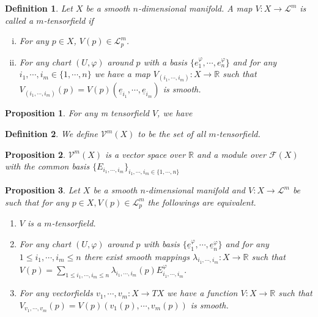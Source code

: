 \documentclass{article}
\newtheorem{proposition}{Proposition}[section]
\newtheorem{definition}{Definition}[section]
\numberwithin{equation}{section}
\begin{document}
\begin{definition}
Let $X$ be a smooth $n$-dimensional manifold. A map $V:X\to\mathcal{L}^m$ is called a $m$-tensorfield if 
\begin{enumerate}[i.]
\item For any $p\in X$, $V(p)\in\mathcal{L}^m_p$.
\item For any chart $(U,\varphi)$ around $p$ with a basis $\{e_1^\varphi,\cdots,e_n^\varphi\}$ and for any $i_1,\cdots,i_m\in\{1,\cdots,n\}$ we have a map $V_{(i_1,\cdots,i_m)}:X\to\mathbb{R}$ such that $V_{(i_1,\cdots,i_m)}(p)=V(p)(\underline{e}_{i_1},\cdots,\underline{e}_{i_m})$ is smooth.
\end{enumerate}
\end{definition}

\begin{proposition}
For any m tensorfield $V$, we have
\end{proposition}

\begin{definition}
We define $\mathcal{V}^m(X)$ to be the set of all $m$-tensorfield.
\end{definition}

\begin{proposition}
$\mathcal{V}^m(X)$ is a vector space over $\mathbb{R}$ and a module over $\mathcal{F}(X)$ with the common basis $\{E_{i_1,\cdots,i_m}\}_{i_1,\cdots,i_m\in\{1,\cdots,n\}}$
\end{proposition}

\begin{proposition}
Let $X$ be a smooth $n$-dimensional manifold and $V:X\to\mathcal{L}^m$ be such that for any $p\in X, V(p)\in\mathcal{L}_p^m$ the followings are equivalent.
\begin{enumerate}
\item $V$ is a $m$-tensorfield.
\item For any chart $(U,\varphi)$ around $p$ with basis $\{\underline{e}_1^\varphi,\cdots,\underline{e}_n^\varphi\}$ and for any $1\leq i_1,\cdots,i_m\leq n$ there exist smooth mappings $\lambda_{i_1,\cdots,i_m}:X\to\mathbb{R}$ such that $V(p)=\sum_{1\leq i_1,\cdots,i_m\leq n} \lambda_{i_1,\cdots,i_m}(p)E_{i_1,\cdots,i_m}^\varphi$. 
\item For any vectorfields $v_1,\cdots,v_m:X\to TX$ we have a function $V:X\to\mathbb{R}$ such that $V_{v_1,\cdots,v_m}(p)=V(p)(v_1(p),\cdots,v_m(p))$ is smooth.
\end{enumerate}
\end{proposition}
\end{document}
